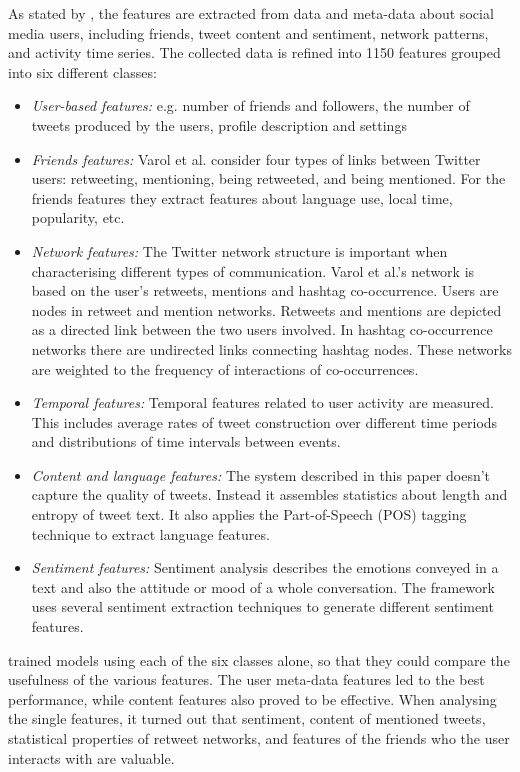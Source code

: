     As stated by \textcite[281]{OnlineHumanBotInteractions}, the features are extracted from data and meta-data about social media users, including friends, tweet content and sentiment, network patterns, and activity time series. The collected data is refined into 1150 features grouped into six different classes:
    \begin{itemize}
        \item \textit{User-based features:} e.g. number of friends and followers, the number of tweets produced by the users, profile description and settings
        \item \textit{Friends features:} Varol et al. consider four types of links between Twitter users: retweeting, mentioning, being retweeted, and being mentioned. For the friends features they extract features about language use, local time, popularity, etc.
        \item \textit{Network features:} The Twitter network structure is important when characterising different types of communication. Varol et al.’s network is based on the user’s retweets, mentions and hashtag co-occurrence. Users are nodes in retweet and mention networks. Retweets and mentions are depicted as a directed link between the two users involved. In hashtag co-occurrence networks there are undirected links connecting hashtag nodes. These networks are weighted to the frequency of interactions of co-occurrences. 
        \item \textit{Temporal features:} Temporal features related to user activity are measured. This includes average rates of tweet construction over different time periods and distributions of time intervals between events.
        \item \textit{Content and language features:} The system described in this paper doesn’t capture the quality of tweets. Instead it assembles statistics about length and entropy of tweet text. It also applies the Part-of-Speech (POS) tagging technique to extract language features.
        \item \textit{Sentiment features:} Sentiment analysis describes the emotions conveyed in a text and also the attitude or mood of a whole conversation. The framework uses several sentiment extraction techniques to generate different sentiment features. 
    \end{itemize}

    \textcite[284]{OnlineHumanBotInteractions} trained models using each of the six classes alone, so that they could compare the usefulness of the various features. The user meta-data features led to the best performance, while content features also proved to be effective. When analysing the single features, it turned out that sentiment, content of mentioned tweets, statistical properties of retweet networks, and features of the friends who the user interacts with are valuable.
    
